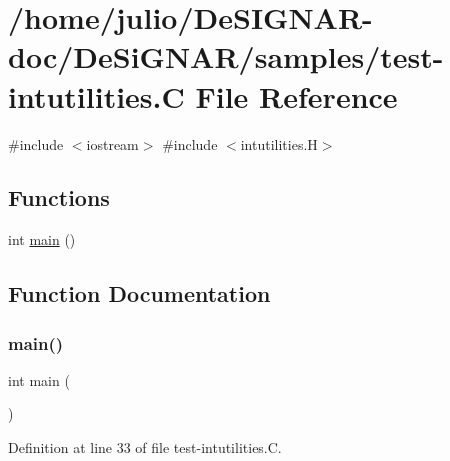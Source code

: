 \hypertarget{test-intutilities_8_c}{}\section{/home/julio/\+De\+S\+I\+G\+N\+A\+R-\/doc/\+De\+Si\+G\+N\+A\+R/samples/test-\/intutilities.C File Reference}
\label{test-intutilities_8_c}
{\ttfamily \#include $<$iostream$>$}\newline
{\ttfamily \#include $<$intutilities.\+H$>$}\newline
\subsection*{Functions}
\begin{DoxyCompactItemize}
\item 
int \hyperlink{test-intutilities_8_c_ae66f6b31b5ad750f1fe042a706a4e3d4}{main} ()
\end{DoxyCompactItemize}


\subsection{Function Documentation}
\mbox{\label{test-intutilities_8_c_ae66f6b31b5ad750f1fe042a706a4e3d4}} 
\subsubsection{\texorpdfstring{main()}{main()}}
{\footnotesize\ttfamily int main (\begin{DoxyParamCaption}{ }\end{DoxyParamCaption})}



Definition at line 33 of file test-\/intutilities.\+C.

